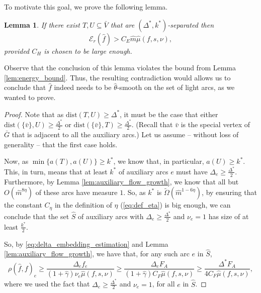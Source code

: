 \documentclass[11pt, letterpaper]{article}
\newtheorem{lemma}[theorem]{Lemma}
\newcommand{\cenergy}{C_{E}}
\newcommand{\ceta}{C_{\eta}}
\newcommand{\cheavy}{C_{H}}
\newcommand{\cfreeze}{C_{F}}
\newcommand{\fauxiliary}{F_{A}}
\newcommand{\tOm}[1]{\widetilde{\Omega}(#1)}
\newcommand{\oG}{\bar{G}}
\newcommand{\oV}{\bar{V}}
\newcommand{\hm}{\widehat{m}}
\newcommand{\hS}{\hat{S}}
\newcommand{\energy}[2]{\mathcal{E}_{#1}(#2)}
\newcommand{\dist}[2]{\mathrm{dist}(#1,#2)}
\newcommand{\ov}{\bar{v}}
\newcommand{\hmu}{\hat{\mu}}
\newcommand{\hgamma}{\hat{\gamma}}
\newcommand{\htheta}{\hat{\theta}}
\newcommand{\vnu}{\boldsymbol{\mathit{\nu}}}
\renewcommand{\aa}{\boldsymbol{\mathit{a}}}
\newcommand{\ff}{\boldsymbol{\mathit{f}}}
\newcommand{\hff}{\boldsymbol{\mathit{\hat{f}}}}
\newcommand{\rr}{\boldsymbol{\mathit{r}}}
\renewcommand{\ss}{\boldsymbol{\mathit{s}}}
\begin{document}
To motivate this goal, we prove the following lemma.


\begin{lemma}
\label{lem:separated_sets}
If there exist $T,U\subseteq \oV$ that are $(\Delta^*,k^*)$-separated then 
\[
\energy{\rr}{\hff}>\cenergy\hm \hmu(\ff,\ss,\vnu),
\]
provided $\cheavy$ is chosen to be large enough.
\end{lemma}

Observe that the conclusion of this lemma violates the bound from Lemma \ref{lem:energy_bound}. Thus, the resulting contradiction would allows us to conclude that $\hff$ indeed needs to be $\htheta$-smooth on the set of light arcs, as we wanted to prove. 

\begin{proof}
Note that as $\dist{T}{U}\geq \Delta^*$, it must be the case that either $\dist{\{\ov\}}{U}\geq \frac{\Delta^*}{2}$ or $\dist{\{\ov\}}{T}\geq \frac{\Delta^*}{2}$. (Recall that $\ov$ is the special vertex of $\oG$ that is adjacent to all the auxiliary arcs.) Let us assume -- without loss of generality -- that the first case holds.


Now, as $\min\{\aa(T),\aa(U)\}\geq k^*$, we know that, in particular, $\aa(U)\geq k^*$. This, in turn, means that at least $k^*$ of auxiliary arcs $e$ must have $\Delta_e\geq \frac{\Delta^*}{2}$. Furthermore, by Lemma \ref{lem:auxiliary_flow_growth}, we know that all but $O(\hm^{8\eta})$ of these arcs have measure $1$. So, as $k^*$ is $\tOm{\hm^{1-6\eta}}$, by ensuring that the constant $\ceta$ in the definition of $\eta$ (\eqref{eq:def_eta}) is big enough, we can conclude that the set $\hS$ of auxiliary arcs with $\Delta_e\geq \frac{\Delta^*}{2}$ and $\nu_e=1$ has size of at least $\frac{k^*}{2}$.

So, by \eqref{eq:delta_embedding_estimation} and Lemma \ref{lem:auxiliary_flow_growth}, we have that, for any such arc $e$ in $\hS$,
\[
\rho(\hff,\ff)_e \geq \frac{\Delta_e f_e}{(1+\hgamma)\nu_e \hmu(\ff,\ss,\vnu)} \geq \frac{\Delta_e \fauxiliary}{(1+\hgamma)\cfreeze \hmu(\ff,\ss,\vnu)}\geq \frac{\Delta^* \fauxiliary}{4\cfreeze \hmu(\ff,\ss,\vnu)},
\]
where we used the fact that $\Delta_e\geq \frac{\Delta^*}{2}$ and $\nu_e=1$, for all $e$ in $\hS$.


\end{proof}
\end{document}
